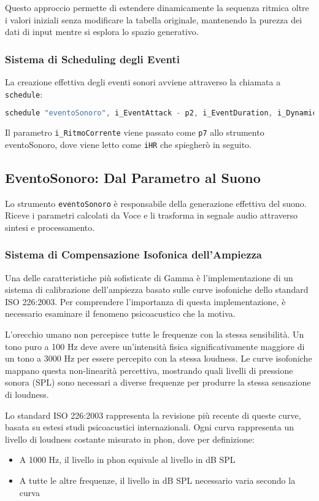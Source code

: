 Questo approccio permette di estendere dinamicamente la sequenza ritmica oltre i valori iniziali senza modificare la tabella originale, mantenendo la purezza dei dati di input mentre si esplora lo spazio generativo.
\subsubsection{Sistema di Scheduling degli Eventi}
La creazione effettiva degli eventi sonori avviene attraverso la chiamata a \texttt{schedule}:

\begin{lstlisting}[language=C]
schedule "eventoSonoro", i_EventAttack - p2, i_EventDuration, i_DynamicIndex, i_Freq1, i_Pos, i_RitmoCorrente, i_Freq2, i_ifnAttacco, gi_Index, i_IdComp, i_SensoMovimento, i_ifn_section_env, i_section_start_time, i_section_duration
\end{lstlisting}

Il parametro \texttt{i\_RitmoCorrente} viene passato come \texttt{p7} allo strumento eventoSonoro, dove viene letto come \texttt{iHR} che spiegherò in seguito.
\subsection{EventoSonoro: Dal Parametro al Suono}
Lo strumento \texttt{eventoSonoro} è responsabile della generazione effettiva del suono. Riceve i parametri calcolati da Voce e li trasforma in segnale audio attraverso sintesi e processamento.
\subsubsection{Sistema di Compensazione Isofonica dell'Ampiezza}
Una delle caratteristiche più sofisticate di Gamma è l'implementazione di un sistema di calibrazione dell'ampiezza basato sulle curve isofoniche dello standard ISO 226:2003\cite{ISO2262003}. Per comprendere l'importanza di questa implementazione, è necessario esaminare il fenomeno psicoacustico che la motiva.

L'orecchio umano non percepisce tutte le frequenze con la stessa sensibilità. Un tono puro a 100 Hz deve avere un'intensità fisica significativamente maggiore di un tono a 3000 Hz per essere percepito con la stessa loudness. Le curve isofoniche mappano questa non-linearità percettiva, mostrando quali livelli di pressione sonora (SPL) sono necessari a diverse frequenze per produrre la stessa sensazione di loudness.

Lo standard ISO 226:2003 rappresenta la revisione più recente di queste curve, basata su estesi studi psicoacustici internazionali. Ogni curva rappresenta un livello di loudness costante misurato in phon, dove per definizione:
\begin{itemize}
 \item A 1000 Hz, il livello in phon equivale al livello in dB SPL
 \item A tutte le altre frequenze, il livello in dB SPL necessario varia secondo la curva
\end{itemize}

